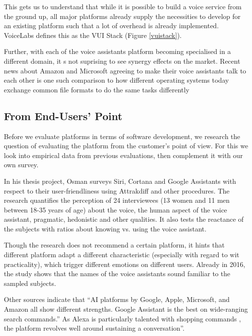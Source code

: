This gets us to understand that while it is possible to build a voice service from the ground up, all major platforms already supply the necessities to develop for an existing platform such that a lot of overhead is already implemented. VoiceLabs defines this as the VUI Stack (Figure \ref{vuistack}).

Further, with each of the voice assistants platform becoming specialised in a different domain, %
it s not suprising to see synergy effects on the market. Recent news about
Amazon and Microsoft agreeing to make their voice assistants talk to each other \cite{amznMicrosoft} is one such comparison to how different operating systems today exchange common file formats to do the same tasks differently\\


\subsection*{From End-Users' Point}

Before we evaluate platforms in terms of software development, we research the question of evaluating the platform from the customer's point of view. For this we look into empirical data from previous evaluations, then complement it with our own survey. 

In his thesis project, Osman \cite{osman:siri} surveys Siri, Cortana and Google Assistants with respect to their user-friendliness using Attrakdiff and other procedures. The research quantifies the perception of 24 interviewees (13 women and 11 men between 18-35 years of age) about the voice,  the human aspect of the voice assistant, pragmatic, hedonistic and other qualities. It also tests the reactance of the subjects with ratios about knowing vs. using the voice assistant.

Though the research does not recommend a certain platform, it hints that different platform adapt a different characteristic (especially with regard to wit practicality), which trigger different emotions on different users. Already in 2016, the study shows that the names of the voice assistants sound familiar to the sampled subjects.

Other sources indicate that ``AI platforms by Google, Apple, Microsoft, and Amazon all show different strengths. Google Assistant is the best on wide-ranging search commands.'' \cite{mit:Alexa} %
As Alexa is particularly talented with shopping commands \cite{mit:Alexa}, the platform revolves well around sustaining a conversation''. %

